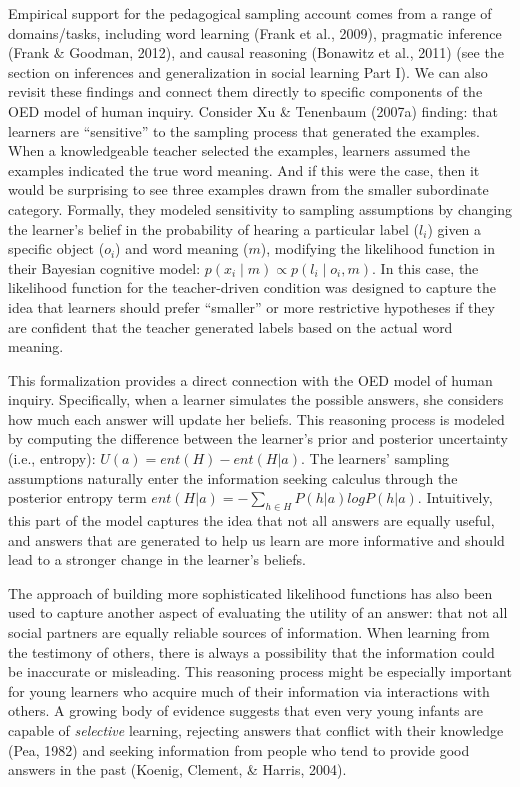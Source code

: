 \documentclass[oneside]{report}
\begin{document}
Empirical support for the pedagogical sampling account comes from a
range of domains/tasks, including word learning (Frank et al., 2009),
pragmatic inference (Frank \& Goodman, 2012), and causal reasoning
(Bonawitz et al., 2011) (see the section on inferences and
generalization in social learning Part I). We can also revisit these
findings and connect them directly to specific components of the OED
model of human inquiry. Consider Xu \& Tenenbaum (2007a) finding: that
learners are ``sensitive'' to the sampling process that generated the
examples. When a knowledgeable teacher selected the examples, learners
assumed the examples indicated the true word meaning. And if this were
the case, then it would be surprising to see three examples drawn from
the smaller subordinate category. Formally, they modeled sensitivity to
sampling assumptions by changing the learner's belief in the probability
of hearing a particular label (\(l_i\)) given a specific object
(\(o_i\)) and word meaning (\(m\)), modifying the likelihood function in
their Bayesian cognitive model:
\(p(x_i \mid m) \propto p(l_i \mid o_i, m)\). In this case, the
likelihood function for the teacher-driven condition was designed to
capture the idea that learners should prefer ``smaller'' or more
restrictive hypotheses if they are confident that the teacher generated
labels based on the actual word meaning.

This formalization provides a direct connection with the OED model of
human inquiry. Specifically, when a learner simulates the possible
answers, she considers how much each answer will update her beliefs.
This reasoning process is modeled by computing the difference between
the learner's prior and posterior uncertainty (i.e., entropy):
\(U(a) = ent(H) - ent(H|a)\). The learners' sampling assumptions
naturally enter the information seeking calculus through the posterior
entropy term \(ent(H|a) = -\sum_{h\in H}{P(h|a)logP(h|a)}\).
Intuitively, this part of the model captures the idea that not all
answers are equally useful, and answers that are generated to help us
learn are more informative and should lead to a stronger change in the
learner's beliefs.

The approach of building more sophisticated likelihood functions has
also been used to capture another aspect of evaluating the utility of an
answer: that not all social partners are equally reliable sources of
information. When learning from the testimony of others, there is always
a possibility that the information could be inaccurate or misleading.
This reasoning process might be especially important for young learners
who acquire much of their information via interactions with others. A
growing body of evidence suggests that even very young infants are
capable of \emph{selective} learning, rejecting answers that conflict
with their knowledge (Pea, 1982) and seeking information from people who
tend to provide good answers in the past (Koenig, Clement, \& Harris,
2004).
\end{document}
